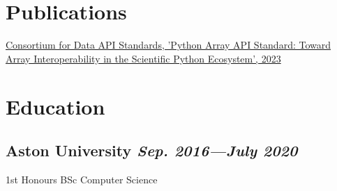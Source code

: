 \documentclass[11pt]{article}
\newcommand{\datedsubsection}[2]{\subsection*{#1 \hfill \textnormal{\scriptsize\textit{#2}}}}
\newcommand{\listhighlights}[1]{
	\begin{itemize}[topsep=2pt, partopsep=0pt, itemsep=2pt, parsep=0pt, leftmargin=12pt]
		#1
	\end{itemize}
}
\begin{document}
%
%

\section*{Publications}

\href{https://proceedings.scipy.org/articles/gerudo-f2bc6f59-001}{Consortium for Data API Standards, 'Python Array API Standard: Toward Array Interoperability in the Scientific Python Ecosystem', 2023}

\section*{Education}

\datedsubsection{Aston University}{Sep. 2016—July 2020}

1st Honours BSc Computer Science
\end{document}
